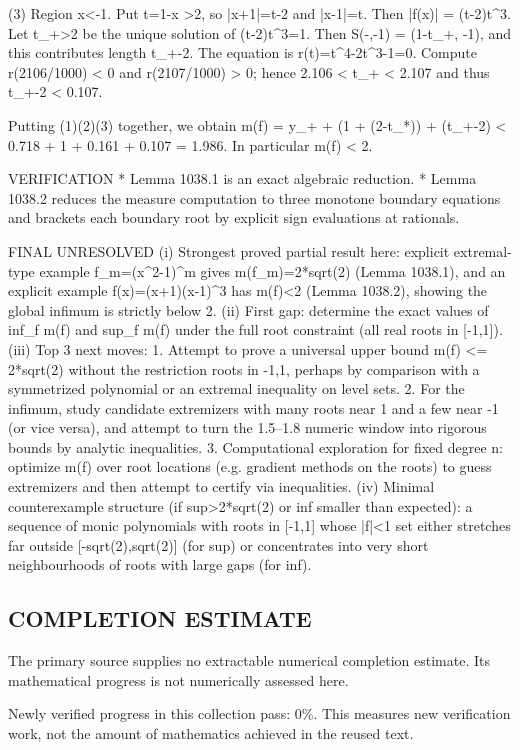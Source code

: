 (3) Region x<-1.  Put t=1-x >2, so |x+1|=t-2 and |x-1|=t. Then
  |f(x)| = (t-2)t^3.
Let t_+>2 be the unique solution of (t-2)t^3=1. Then S\cap(-\infty,-1) = (1-t_+, -1), and this contributes length t_+-2.
The equation is r(t)=t^4-2t^3-1=0. Compute r(2106/1000) < 0 and r(2107/1000) > 0; hence 2.106 < t_+ < 2.107 and thus t_+-2 < 0.107.

Putting (1)(2)(3) together, we obtain
  m(f) = y_+ + (1 + (2-t_*)) + (t_+-2)
      < 0.718 + 1 + 0.161 + 0.107
      = 1.986.
In particular m(f) < 2.

VERIFICATION
* Lemma 1038.1 is an exact algebraic reduction.
* Lemma 1038.2 reduces the measure computation to three monotone boundary equations and brackets each boundary root by explicit sign evaluations at rationals.

FINAL
UNRESOLVED
(i) Strongest proved partial result here: explicit extremal-type example f_m=(x^2-1)^m gives m(f_m)=2*sqrt(2) (Lemma 1038.1), and an explicit example f(x)=(x+1)(x-1)^3 has m(f)<2 (Lemma 1038.2), showing the global infimum is strictly below 2.
(ii) First gap: determine the exact values of inf_f m(f) and sup_f m(f) under the full root constraint (all real roots in [-1,1]).
(iii) Top 3 next moves:
  1. Attempt to prove a universal upper bound m(f) <= 2*sqrt(2) without the restriction roots in {-1,1}, perhaps by comparison with a symmetrized polynomial or an extremal inequality on level sets.
  2. For the infimum, study candidate extremizers with many roots near 1 and a few near -1 (or vice versa), and attempt to turn the 1.5--1.8 numeric window into rigorous bounds by analytic inequalities.
  3. Computational exploration for fixed degree n: optimize m(f) over root locations (e.g. gradient methods on the roots) to guess extremizers and then attempt to certify via inequalities.
(iv) Minimal counterexample structure (if sup>2*sqrt(2) or inf smaller than expected): a sequence of monic polynomials with roots in [-1,1] whose |f|<1 set either stretches far outside [-sqrt(2),sqrt(2)] (for sup) or concentrates into very short neighbourhoods of roots with large gaps (for inf).



\subsection*{COMPLETION ESTIMATE}
The primary source supplies no extractable numerical completion estimate. Its mathematical progress is not numerically assessed here.

Newly verified progress in this collection pass: $0\%$. This measures new verification work, not the amount of mathematics achieved in the reused text.

